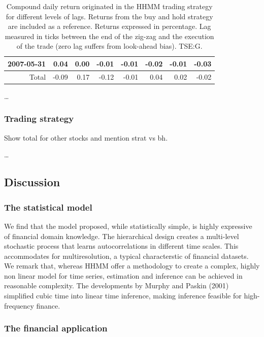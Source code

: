 \documentclass[]{article}
\begin{document}
\begin{table}[ht]
\begin{tabularx}{\textwidth}{rRRRRRRR}
  2007-05-31 & 0.04 & 0.00 & -0.01 & -0.01 & -0.02 & -0.01 & -0.03 \\ 
   \midrule
Total & -0.09 & 0.17 & -0.12 & -0.01 & 0.04 & 0.02 & -0.02 \\ 
   \bottomrule
\end{tabularx}
\endgroup
\caption{Compound daily return originated in the HHMM trading strategy for different levels of lags. Returns from the buy and hold strategy are included as a reference. Returns expressed in percentage. Lag measured in ticks between the end of the zig-zag and the execution of the trade (zero lag suffers from look-ahead bias). TSE:G.} 
\label{tab:tseg-filtered-ins}
\end{table}

\ldots{}

\subsubsection{Trading strategy}\label{trading-strategy-1}

Show total for other stocks and mention strat vs bh.

\ldots{}

\subsection{Discussion}\label{further-research}

\subsubsection{The statistical model}\label{the-statistical-model}

We find that the model proposed, while statistically simple, is highly
expressive of financial domain knowledge. The hierarchical design
creates a multi-level stochastic process that learns autocorrelations in
different time scales. This accommodates for multiresolution, a typical
characterstic of financial datasets. We remark that, whereas HHMM offer
a methodology to create a complex, highly non linear model for time
series, estimation and inference can be achieved in reasonable
complexity. The developments by Murphy and Paskin (2001) simplified
cubic time into linear time inference, making inference feasible for
high-frequency finance.

\subsubsection{The financial
application}\label{the-financial-application}
\end{document}
